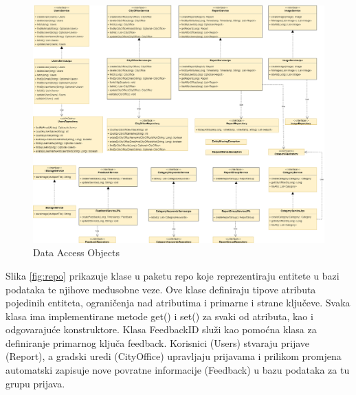 			\begin{figure}[H]
				\includegraphics[width=\textwidth]{slike/dao.png} %
				\caption{Data Access Objects}
				\label{fig:dao} %
			\end{figure}
			
			\eject
			
			Slika \ref{fig:repo} prikazuje klase u paketu repo koje reprezentiraju entitete u bazi podataka te njihove međusobne veze. Ove klase definiraju tipove atributa pojedinih entiteta, ograničenja nad atributima i primarne i strane ključeve. Svaka klasa ima implementirane metode get() i set() za svaki od atributa, kao i odgovarajuće konstruktore. Klasa FeedbackID služi kao pomoćna klasa za definiranje primarnog ključa feedback. Korisnici (Users) stvaraju prijave (Report), a gradski uredi (CityOffice) upravljaju prijavama i prilikom promjena automatski zapisuje nove povratne informacije (Feedback) u bazu podataka za tu grupu prijava.
			
